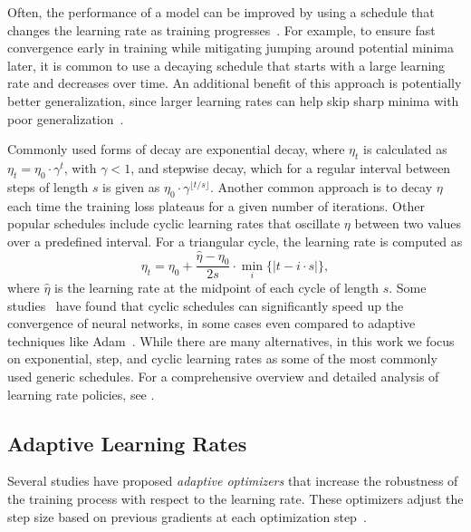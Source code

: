 \documentclass[runningheads]{llncs}
\begin{document}
Often, the performance of a model can be improved by using a schedule that changes the learning rate as training progresses~\cite{wuDemystifyingLearningRate2019b}.
For example, to ensure fast convergence early in training while mitigating jumping around potential minima later, it is common to use a decaying schedule that starts with a large learning rate and decreases over time.
An additional benefit of this approach is potentially better generalization, since larger learning rates can help skip sharp minima with poor generalization~\cite{hochreiterFlatMinima1997,chaudhariEntropySGDBiasingGradient2017}.

Commonly used forms of decay are exponential decay, where $\eta_{t}$ is calculated as
$\eta_{t} = \eta_0 \cdot \gamma^t$,
with $\gamma < 1$, and stepwise decay, which for a regular interval between steps of length $s$ is given as $\eta_0 \cdot \gamma^{\lfloor t/s \rfloor}$.
Another common approach is to decay $\eta$ each time the training loss plateaus for a given number of iterations. Other popular schedules include cyclic learning rates that oscillate $\eta$ between two values over a predefined interval.
For a triangular cycle, the learning rate is computed as
\begin{equation}
	\eta_t = \eta_0 + \frac{\hat{\eta} - \eta_0}{2s} \cdot \min_{i} \{|t-i\cdot s|\},
\end{equation}
where $\hat{\eta}$ is the learning rate at the midpoint of each cycle of length $s$.
Some studies~\cite{smithCyclicalLearningRates2017, smithSuperConvergenceVeryFast2018a} have found that cyclic schedules can significantly speed up the convergence of neural networks, in some cases even compared to adaptive techniques like Adam~\cite{kingmaAdamMethodStochastic2017b}.
While there are many alternatives, in this work we focus on exponential, step, and cyclic learning rates as some of the most commonly used generic schedules.
For a comprehensive overview and detailed analysis of learning rate policies, see \textcite{wuDemystifyingLearningRate2019b}.

\subsection{Adaptive Learning Rates}

Several studies have proposed \textit{adaptive optimizers} that increase the robustness of the training process with respect to the learning rate.
These optimizers adjust the step size based on previous gradients at each optimization step~\cite{duchiAdaptiveSubgradientMethods2011}.
\end{document}
